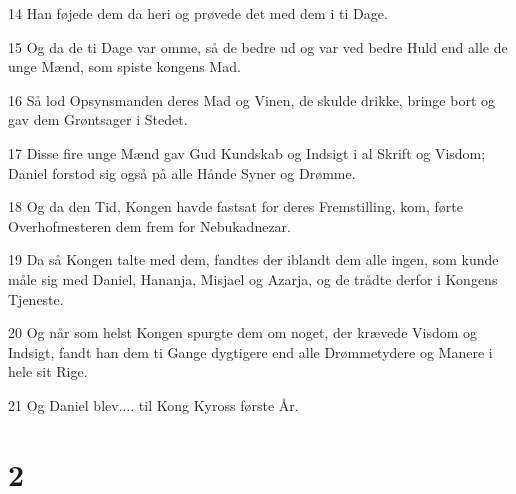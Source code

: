 \par 14 Han føjede dem da heri og prøvede det med dem i ti Dage.
\par 15 Og da de ti Dage var omme, så de bedre ud og var ved bedre Huld end alle de unge Mænd, som spiste kongens Mad.
\par 16 Så lod Opsynsmanden deres Mad og Vinen, de skulde drikke, bringe bort og gav dem Grøntsager i Stedet.
\par 17 Disse fire unge Mænd gav Gud Kundskab og Indsigt i al Skrift og Visdom; Daniel forstod sig også på alle Hånde Syner og Drømme.
\par 18 Og da den Tid, Kongen havde fastsat for deres Fremstilling, kom, førte Overhofmesteren dem frem for Nebukadnezar.
\par 19 Da så Kongen talte med dem, fandtes der iblandt dem alle ingen, som kunde måle sig med Daniel, Hananja, Misjael og Azarja, og de trådte derfor i Kongens Tjeneste.
\par 20 Og når som helst Kongen spurgte dem om noget, der krævede Visdom og Indsigt, fandt han dem ti Gange dygtigere end alle Drømmetydere og Manere i hele sit Rige.
\par 21 Og Daniel blev.... til Kong Kyross første År.

\chapter{2}

